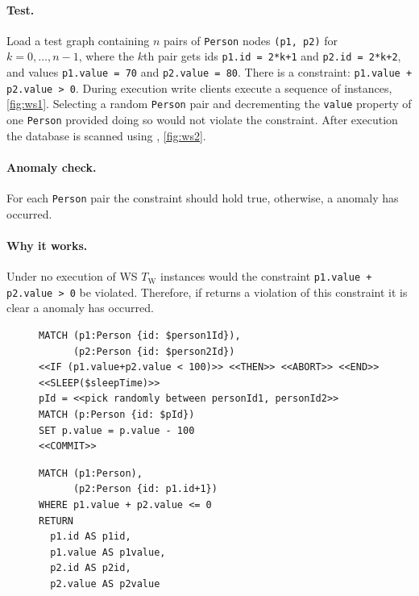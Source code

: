 \paragraph{Test.}
Load a test graph containing $n$ pairs of \texttt{Person} nodes \texttt{(p1, p2)} for $k = 0, \ldots, n-1$, where the $k$th pair gets ids \texttt{p1.id = 2*k+1} and \texttt{p2.id = 2*k+2}, and values \texttt{p1.value = 70} and \texttt{p2.value = 80}.
There is a constraint: \texttt{p1.value + p2.value > 0}.
During execution write clients execute a sequence of  instances, \autoref{fig:ws1}.
Selecting a random \texttt{Person} pair and decrementing the \texttt{value} property of one \texttt{Person} provided doing so would not violate the constraint.
After execution the database is scanned using , \autoref{fig:ws2}.

\paragraph{Anomaly check.}
For each \texttt{Person} pair the constraint should hold true, otherwise, a  anomaly has occurred.

\paragraph{Why it works.}
Under no  execution of WS $T_\mathrm{W}$ instances would the constraint \texttt{p1.value + p2.value > 0} be violated.
Therefore, if  returns a violation of this constraint it is clear a  anomaly has occurred.

\begin{figure}[htb]
\centering
\begin{minipage}{0.55\linewidth}
\begin{lstlisting}[language=cypher,label=fig:ws1,caption=\tx{WS $T_\mathrm{W}$}.]
MATCH (p1:Person {id: $person1Id}),
      (p2:Person {id: $person2Id})
<<IF (p1.value+p2.value < 100)>> <<THEN>> <<ABORT>> <<END>>
<<SLEEP($sleepTime)>>
pId = <<pick randomly between personId1, personId2>>
MATCH (p:Person {id: $pId})
SET p.value = p.value - 100
<<COMMIT>>
\end{lstlisting}
\end{minipage}
\quad
\begin{minipage}{0.33\linewidth}
\begin{lstlisting}[language=cypher,label=fig:ws2,caption=\tx{WS $T_\mathrm{R}$}.]
MATCH (p1:Person),
      (p2:Person {id: p1.id+1})
WHERE p1.value + p2.value <= 0
RETURN
  p1.id AS p1id,
  p1.value AS p1value,
  p2.id AS p2id,
  p2.value AS p2value
\end{lstlisting}
\end{minipage}
\end{figure}

